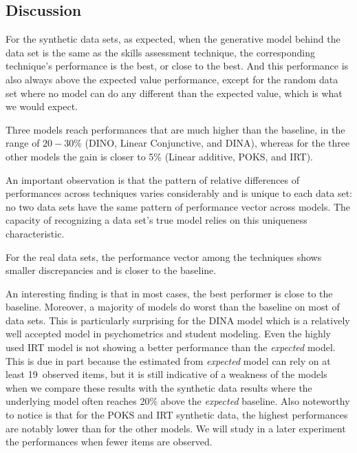 

\subsection{Discussion}

For the synthetic data sets, as expected, when the generative model behind the data set is the same as the skills assessment technique, the corresponding technique's performance is the best, or close to the best.  And this performance is also always above the expected value performance, except for the random data set where no model can do any different than the expected value, which is what we would expect.

Three models reach performances that are much higher than the baseline, in the range of $20-30$\% (DINO, Linear Conjunctive, and DINA), whereas for the three other models the gain is closer to 5\% (Linear additive, POKS, and IRT).

An important observation is that the pattern of relative differences of performances across techniques varies considerably and is unique to each data set: no two data sets have the same pattern of performance vector across models.  The capacity of recognizing a data set's true model relies on this uniqueness characteristic.

For the real data sets, the performance vector among the techniques shows smaller discrepancies and is closer to the baseline. 

An interesting finding is that in most cases, the best performer is close to the baseline. Moreover, a majority of models do worst than the baseline on most of data sets. This is particularly surprising for the DINA model which is a relatively well accepted model in psychometrics and student modeling.  Even the highly used IRT model is not showing a better performance than the \textit{expected} model.  This is due in part because the estimated from \textit{expected} model can rely on at least 19~observed items, but it is still indicative of a weakness of the models when we compare these results with the synthetic data results where the underlying model often reaches 20\% above the \textit{expected} baseline.  Also noteworthy to notice is that for the POKS and IRT synthetic data, the highest performances are notably lower than for the other models.  We will study in a later experiment the performances when fewer items are observed.

